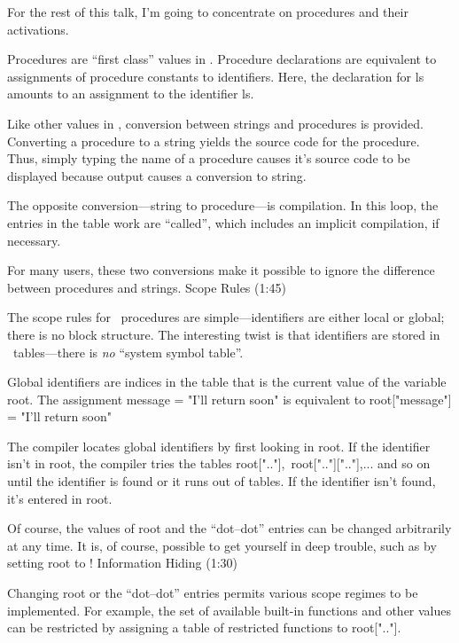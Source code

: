 For the rest of this talk,
I'm going to concentrate on procedures and their activations.

Procedures are ``first class'' values in \EZ.
Procedure declarations are equivalent to assignments
of procedure constants to identifiers.
Here, the declaration for {\pt ls} amounts
to an assignment to the identifier {\pt ls}.

Like other values in \EZ, conversion between strings
and procedures is provided.
Converting a procedure to a string yields the source
code for the procedure.
Thus, simply typing the name of a procedure causes it's
source code to be displayed because output causes
a conversion to string.

The opposite conversion---string to procedure---is compilation.
In this loop, the entries in the table {\pt work} are
``called'', which includes an implicit compilation, if necessary.

For many users, these two conversions make it possible
to ignore the difference between procedures and strings.
\NewPage\Longtrue
\beginsection Scope Rules (1:45)

The scope rules for \EZ\ procedures are simple---identifiers
are either local or global; there is no block structure.
The interesting twist is that identifiers are stored in
\EZ\ tables---there is {\sl no\/} ``system symbol table''.

Global identifiers are indices in the table that
is the current value of the variable {\pt root}.
The assignment
\program
message = "I'll return soon"
\endprogram\smallskip
is equivalent to
\program
root["message"] = "I'll return soon"
\endprogram

The compiler locates global identifiers by first looking in {\pt root}.
If the identifier isn't in {\pt root}, the compiler tries
the tables
\program
root[".."]\rm,\pt\ root[".."][".."]\rm,...
\endprogram\smallskip
and so on until the identifier is found or it runs out of tables.
If the identifier isn't found, it's entered in {\pt root}.

Of course, the values of {\pt root} and the ``dot--dot''
entries can be changed arbitrarily at any time.
It is, of course, possible to get yourself in deep trouble,
such as by setting {\pt root} to {}!
\NewPage\Longtrue
\beginsection Information Hiding (1:30)

Changing {\pt root} or the ``dot--dot'' entries
permits various scope regimes to be implemented.
For example, the set of available built-in functions
and other values can be restricted by assigning
a table of restricted functions to {\pt root[".."]}.

